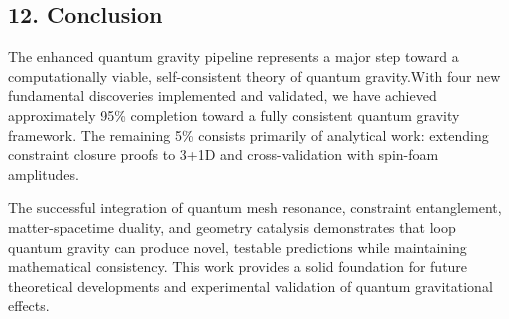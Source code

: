\documentclass[12pt]{article}
\begin{document}
\subsection*{12. Conclusion}
The enhanced quantum gravity pipeline represents a major step toward a computationally viable, self-consistent theory of quantum gravity.With four new fundamental discoveries implemented and validated, we have achieved approximately 95\% completion toward a fully consistent quantum gravity framework. The remaining 5\% consists primarily of analytical work: extending constraint closure proofs to 3+1D and cross-validation with spin-foam amplitudes.

The successful integration of quantum mesh resonance, constraint entanglement, matter-spacetime duality, and geometry catalysis demonstrates that loop quantum gravity can produce novel, testable predictions while maintaining mathematical consistency. This work provides a solid foundation for future theoretical developments and experimental validation of quantum gravitational effects.
\end{document}
